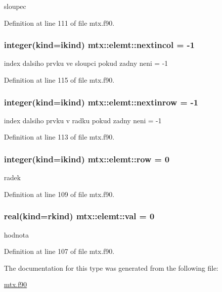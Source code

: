 sloupec 



\-Definition at line 111 of file mtx.\-f90.

\hypertarget{structmtx_1_1elemt_a2a4b03e64a45c4349c06a426a0e3e064}{
\subsubsection[{nextincol}]{\setlength{\rightskip}{0pt plus 5cm}integer(kind=ikind) {\bf mtx\-::elemt\-::nextincol} = -\/1}}\label{structmtx_1_1elemt_a2a4b03e64a45c4349c06a426a0e3e064}


index dalsiho prvku ve sloupci pokud zadny neni = -\/1 



\-Definition at line 115 of file mtx.\-f90.

\hypertarget{structmtx_1_1elemt_a49dfbfe79b719bc8c5d7678809b799b7}{
\subsubsection[{nextinrow}]{\setlength{\rightskip}{0pt plus 5cm}integer(kind=ikind) {\bf mtx\-::elemt\-::nextinrow} = -\/1}}\label{structmtx_1_1elemt_a49dfbfe79b719bc8c5d7678809b799b7}


index dalsiho prvku v radku pokud zadny neni = -\/1 



\-Definition at line 113 of file mtx.\-f90.

\hypertarget{structmtx_1_1elemt_aa2b8f13c3e5c242af5d3d6a13f0deecf}{
\subsubsection[{row}]{\setlength{\rightskip}{0pt plus 5cm}integer(kind=ikind) {\bf mtx\-::elemt\-::row} = 0}}\label{structmtx_1_1elemt_aa2b8f13c3e5c242af5d3d6a13f0deecf}


radek 



\-Definition at line 109 of file mtx.\-f90.

\hypertarget{structmtx_1_1elemt_ad16a0504f754e953a16926f9414e12b5}{
\subsubsection[{val}]{\setlength{\rightskip}{0pt plus 5cm}real(kind=rkind) {\bf mtx\-::elemt\-::val} = 0}}\label{structmtx_1_1elemt_ad16a0504f754e953a16926f9414e12b5}


hodnota 



\-Definition at line 107 of file mtx.\-f90.



\-The documentation for this type was generated from the following file\-:\begin{DoxyCompactItemize}
\item 
\hyperlink{mtx_8f90}{mtx.\-f90}\end{DoxyCompactItemize}
